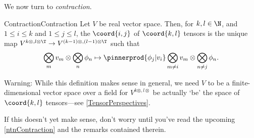 We now turn to \emph{contraction}.
\begin{dfn}{Contraction}{Contraction}
Let $V$ be real vector space.  Then, for $k,l\in \N$, and $1\leq i\leq k$ and $1\leq j\leq l$, the $\coord{i,j}$  of $\coord{k,l}$ tensors is the unique map $V^{k\otimes ,l\otimes \T}\rightarrow V^{(k-1)\otimes ,(l-1)\otimes \T}$ such that
\begin{equation}\label{eqn5.4.41}
\bigotimes _mv_m\otimes \bigotimes _{n}\phi _n\mapsto \pinnerprod{\phi _j|v_i}\bigotimes _{m\neq i}v_m\otimes \bigotimes _{n\neq j}\phi _n.
\end{equation}
\begin{rmk}
	Warning:  While this definition makes sense in general, we need $V$ to be a finite-dimensional vector space over a field for $V^{k\otimes ,l\otimes}$ be actually `be' the space of $\coord{k,l}$ tensors---see \cref{TensorPerspectives}.
\end{rmk}
\begin{rmk}
	If this doesn't yet make sense, don't worry until you've read the upcoming \cref{ntnContraction} and the remarks contained therein.
\end{rmk}
\end{dfn}
